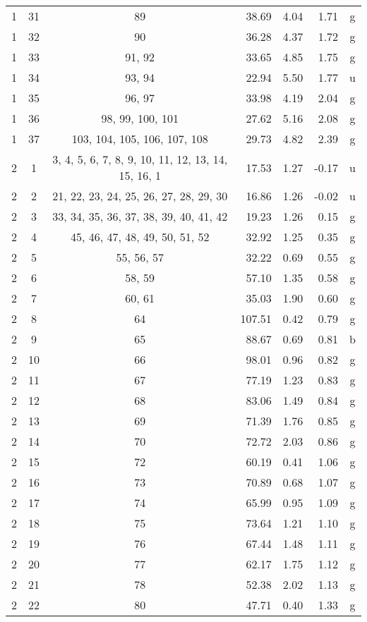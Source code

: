 \begin{center}
\begin{longtable}{cccrrrc}
  1 & 31 & 89 & 38.69 &  4.04 &  1.71 & g\\
  1 & 32 & 90 & 36.28 &  4.37 &  1.72 & g\\
  1 & 33 & 91, 92 & 33.65 &  4.85 &  1.75 & g\\
  1 & 34 & 93, 94 & 22.94 &  5.50 &  1.77 & u\\
  1 & 35 & 96, 97 & 33.98 &  4.19 &  2.04 & g\\
  1 & 36 & 98, 99, 100, 101 & 27.62 &  5.16 &  2.08 & g\\
  1 & 37 & 103, 104, 105, 106, 107, 108 & 29.73 &  4.82 &  2.39 & g\\
  2 & 1 & 3, 4, 5, 6, 7, 8, 9, 10, 11, 12, 13, 14, 15, 16, 1 & 17.53 &  1.27 & -0.17 & u\\
  2 & 2 & 21, 22, 23, 24, 25, 26, 27, 28, 29, 30 & 16.86 &  1.26 & -0.02 & u\\
  2 & 3 & 33, 34, 35, 36, 37, 38, 39, 40, 41, 42 & 19.23 &  1.26 &  0.15 & g\\
  2 & 4 & 45, 46, 47, 48, 49, 50, 51, 52 & 32.92 &  1.25 &  0.35 & g\\
  2 & 5 & 55, 56, 57 & 32.22 &  0.69 &  0.55 & g\\
  2 & 6 & 58, 59 & 57.10 &  1.35 &  0.58 & g\\
  2 & 7 & 60, 61 & 35.03 &  1.90 &  0.60 & g\\
  2 & 8 & 64 & 107.51 &  0.42 &  0.79 & g\\
  2 & 9 & 65 & 88.67 &  0.69 &  0.81 & b\\
  2 & 10 & 66 & 98.01 &  0.96 &  0.82 & g\\
  2 & 11 & 67 & 77.19 &  1.23 &  0.83 & g\\
  2 & 12 & 68 & 83.06 &  1.49 &  0.84 & g\\
  2 & 13 & 69 & 71.39 &  1.76 &  0.85 & g\\
  2 & 14 & 70 & 72.72 &  2.03 &  0.86 & g\\
  2 & 15 & 72 & 60.19 &  0.41 &  1.06 & g\\
  2 & 16 & 73 & 70.89 &  0.68 &  1.07 & g\\
  2 & 17 & 74 & 65.99 &  0.95 &  1.09 & g\\
  2 & 18 & 75 & 73.64 &  1.21 &  1.10 & g\\
  2 & 19 & 76 & 67.44 &  1.48 &  1.11 & g\\
  2 & 20 & 77 & 62.17 &  1.75 &  1.12 & g\\
  2 & 21 & 78 & 52.38 &  2.02 &  1.13 & g\\
  2 & 22 & 80 & 47.71 &  0.40 &  1.33 & g\\

\end{longtable}
\end{center}
